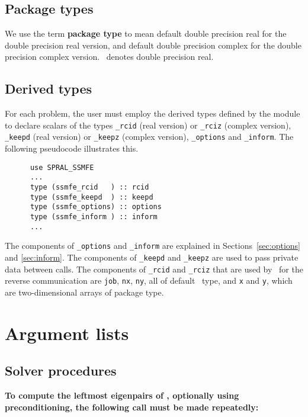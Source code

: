 \subsection{Package types} 

We use the term {\bf package type} to mean
default double precision real for the double precision real version,
and default double precision complex
for the double precision complex version. 
\REALDP\
denotes double precision real.

\subsection{Derived types}
\label{derived types}
For each problem, the user must employ the derived types defined by the
module to declare scalars of the types 
{\tt \solver\_rcid} (real version) or 
{\tt \solver\_rciz} (complex version), 
{\tt \solver\_keepd} (real version) or
{\tt \solver\_keepz} (complex version),
{\tt \solver\_options} and 
{\tt \solver\_inform}.
The following pseudocode illustrates this.
\begin{verbatim}
      use SPRAL_SSMFE    
      ...
      type (ssmfe_rcid   ) :: rcid
      type (ssmfe_keepd  ) :: keepd
      type (ssmfe_options) :: options
      type (ssmfe_inform ) :: inform
      ...
\end{verbatim}

The components of 
{\tt \solver\_options} and 
{\tt \solver\_inform} are explained
in Sections~\ref{sec:options} and \ref{sec:inform}. 
The components of {\tt \solver\_keepd} and {\tt \solver\_keepz} 
are used to pass 
private data between calls. 
The components of
{\tt \solver\_rcid} and 
{\tt \solver\_rciz} 
that are used by \fullpackagename\ 
for the reverse communication are
{\tt job},
{\tt nx},
{\tt ny}, all of default \Integer\ type,
and
{\tt x} and {\tt y},
which are 
two-dimensional arrays
of package type.


\section{Argument lists}

\subsection{Solver procedures}

{\bf
To compute %
the leftmost eigenpairs of ,
optionally using preconditioning,
the following call must be made repeatedly:
}

